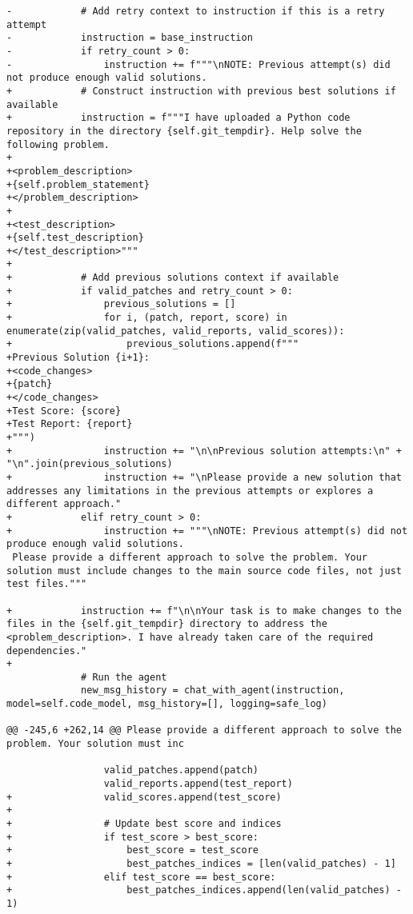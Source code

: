 \begin{lstlisting}[style=diffstyle]
-            # Add retry context to instruction if this is a retry attempt
-            instruction = base_instruction
-            if retry_count > 0:
-                instruction += f"""\nNOTE: Previous attempt(s) did not produce enough valid solutions. 
+            # Construct instruction with previous best solutions if available
+            instruction = f"""I have uploaded a Python code repository in the directory {self.git_tempdir}. Help solve the following problem.
+
+<problem_description>
+{self.problem_statement}
+</problem_description>
+
+<test_description>
+{self.test_description}
+</test_description>"""
+
+            # Add previous solutions context if available
+            if valid_patches and retry_count > 0:
+                previous_solutions = []
+                for i, (patch, report, score) in enumerate(zip(valid_patches, valid_reports, valid_scores)):
+                    previous_solutions.append(f"""
+Previous Solution {i+1}:
+<code_changes>
+{patch}
+</code_changes>
+Test Score: {score}
+Test Report: {report}
+""")
+                instruction += "\n\nPrevious solution attempts:\n" + "\n".join(previous_solutions)
+                instruction += "\nPlease provide a new solution that addresses any limitations in the previous attempts or explores a different approach."
+            elif retry_count > 0:
+                instruction += """\nNOTE: Previous attempt(s) did not produce enough valid solutions. 
 Please provide a different approach to solve the problem. Your solution must include changes to the main source code files, not just test files."""
 
+            instruction += f"\n\nYour task is to make changes to the files in the {self.git_tempdir} directory to address the <problem_description>. I have already taken care of the required dependencies."
+
             # Run the agent
             new_msg_history = chat_with_agent(instruction, model=self.code_model, msg_history=[], logging=safe_log)
             
@@ -245,6 +262,14 @@ Please provide a different approach to solve the problem. Your solution must inc
 
                 valid_patches.append(patch)
                 valid_reports.append(test_report)
+                valid_scores.append(test_score)
+
+                # Update best score and indices
+                if test_score > best_score:
+                    best_score = test_score
+                    best_patches_indices = [len(valid_patches) - 1]
+                elif test_score == best_score:
+                    best_patches_indices.append(len(valid_patches) - 1)
 

\end{lstlisting}
